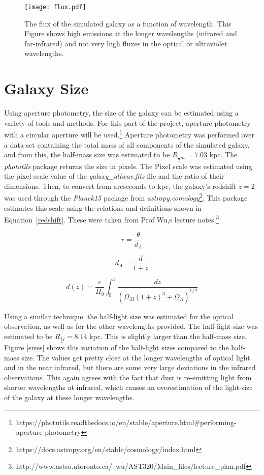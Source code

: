 \documentclass[10pt, preprint]{aastex}
\begin{document}
\begin{figure}[h!]
    \centering
    \texttt{[image: flux.pdf]}
    \caption{The flux of the simulated galaxy as a function of wavelength. This Figure shows high emissions at the longer wavelengths (infrared and far-infrared) and not very high fluxes in the optical or ultraviolet wavelengths.}
    \label{flux}
\end{figure}

\section{Galaxy Size}

Using aperture photometry, the size of the galaxy can be estimated using a variety of tools and methods. For this part of the project, aperture photometry with a circular aperture will be used.\footnote{https://photutils.readthedocs.io/en/stable/aperture.html\#performing-aperture-photometry} Aperture photometry was performed over a data set containing the total mass of all components of the simulated galaxy, and from this, the half-mass size was estimated to be $R_{\frac{1}{2}m} = 7.03$ kpc. The \textit{photutils} package returns the size in pixels. The Pixel scale was estimated using the pixel scale value of the \textit{galaxy\_allwav.fits} file and the ratio of their dimensions. Then, to convert from arcseconds to kpc, the galaxy's redshift $z = 2$ was used through the \textit{Planck15} package from \textit{astropy.comology}\footnote{https://docs.astropy.org/en/stable/cosmology/index.html}. This package estimates this scale using the relations and definitions shown in Equation~\ref{redshift}. These were taken from Prof Wu,s lecture notes.\footnote{http://www.astro.utoronto.ca/~wu/AST320/Main\_files/lecture\_plan.pdf}

$$ r = \frac{\theta}{d_A} $$

\begin{equation}\label{redshift}
    d_A = \frac{d}{1+z}
\end{equation}

$$  d(z) = \frac{c}{H_0} \int_0^z \frac{dz}{(\Omega_M(1+z)^3 + \Omega_{\Lambda})^{1/2}} $$

Using a similar technique, the half-light size was estimated for the optical observation, as well as for the other wavelengths provided. The half-light size was estimated to be $R_{\frac{1}{2}l} = 8.14$ kpc. This is slightly larger than the half-mass size. Figure \ref{sizes} shows this variation of the half-light sizes compared to the half-mass size. The values get pretty close at the longer wavelengths of optical light and in the near infrared, but there are some very large deviations in the infrared observations. This again agrees with the fact that dust is re-emitting light from shorter wavelengths at infrared, which causes an overestimation of the light-size of the galaxy at these longer wavelengths.
\end{document}
